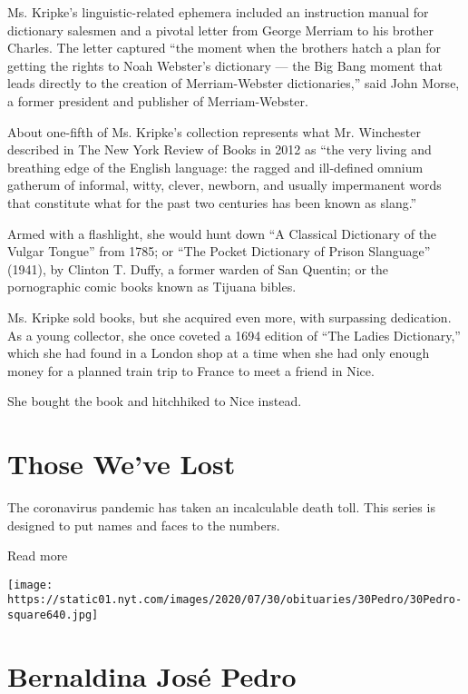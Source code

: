 Ms. Kripke's linguistic-related ephemera included an instruction manual
for dictionary salesmen and a pivotal letter from George Merriam to his
brother Charles. The letter captured ``the moment when the brothers
hatch a plan for getting the rights to Noah Webster's dictionary --- the
Big Bang moment that leads directly to the creation of Merriam-Webster
dictionaries,'' said John Morse, a former president and publisher of
Merriam-Webster.

About one-fifth of Ms. Kripke's collection represents what Mr.
Winchester described in The New York Review of Books in 2012 as ``the
very living and breathing edge of the English language: the ragged and
ill-defined omnium gatherum of informal, witty, clever, newborn, and
usually impermanent words that constitute what for the past two
centuries has been known as slang.''

Armed with a flashlight, she would hunt down ``A Classical Dictionary of
the Vulgar Tongue'' from 1785; or ``The Pocket Dictionary of Prison
Slanguage'' (1941), by Clinton T. Duffy, a former warden of San Quentin;
or the pornographic comic books known as Tijuana bibles.

Ms. Kripke sold books, but she acquired even more, with surpassing
dedication. As a young collector, she once coveted a 1694 edition of
``The Ladies Dictionary,'' which she had found in a London shop at a
time when she had only enough money for a planned train trip to France
to meet a friend in Nice.

She bought the book and hitchhiked to Nice instead.

\href{https://www.nytimes.com/interactive/2020/obituaries/people-died-coronavirus-obituaries.html?action=click\&pgtype=Article\&state=default\&region=BELOW_MAIN_CONTENT\&context=covid_obits_promo}{}

\hypertarget{those-weve-lost}{%
\section{Those We've Lost}\label{those-weve-lost}}

The coronavirus pandemic has taken an incalculable death toll. This
series is designed to put names and faces to the numbers.

Read more

\texttt{[image: https://static01.nyt.com/images/2020/07/30/obituaries/30Pedro/30Pedro-square640.jpg]}

\hypertarget{bernaldina-josuxe9-pedro}{%
\section{Bernaldina José Pedro}\label{bernaldina-josuxe9-pedro}}

